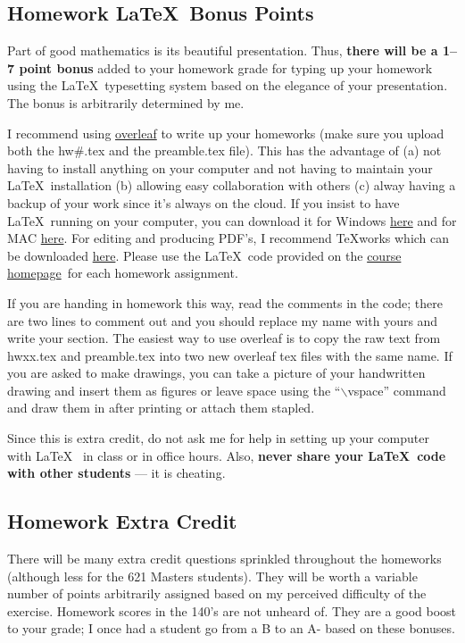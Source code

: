 \documentclass[12pt]{article}
\newcommand{\ingreen}[1]{\color{green}\textbf{#1} \color{black}}
\newcommand{\coursewebpage}{\href{https://github.com/kapelner/QC_Math_621_Fall_2020}{course homepage}}
\newcommand{\qu}[1]{``#1''}
\begin{document}
\subsection*{Homework \LaTeX~Bonus Points}

Part of good mathematics is its beautiful presentation. Thus, \ingreen{there will be a 1--7 point bonus} added to your homework grade  for typing up your homework using the \LaTeX ~typesetting system based on the elegance of your presentation. The bonus is arbitrarily determined by me.

I recommend using \href{http://overleaf.com}{overleaf} to write up your homeworks (make sure you upload both the hw\#.tex and the preamble.tex file). This has the advantage of (a) not having to install anything on your computer and not having to maintain your \LaTeX ~installation (b) allowing easy collaboration with others (c) alway having a backup of your work since it's always on the cloud. If you insist to have \LaTeX ~running on your computer, you can download it for Windows \href{http://www.miktex.org/download}{here} and for MAC \href{http://www.tug.org/mactex/}{here}. For editing and producing PDF's, I recommend \TeX works which can be downloaded \href{http://www.tug.org/texworks/#Getting_TeXworks}{here}. Please use the \LaTeX ~code provided on the \coursewebpage ~for each homework assignment. 

If you are handing in homework this way, read the comments in the code; there are two lines to comment out and you should replace my name with yours and write your section. The easiest way to use overleaf is to copy the raw text from hwxx.tex and preamble.tex into two new overleaf tex files with the same name. If you are asked to make drawings, you can take a picture of your handwritten drawing and insert them as figures or leave space using the \qu{$\backslash$vspace} command and draw them in after printing or attach them stapled.

Since this is extra credit, do not ask me for help in setting up your computer with \LaTeX~ in class or in office hours. Also, \textbf{never share your \LaTeX~code with other students} --- it is cheating.

\subsection*{Homework Extra Credit}

There will be many extra credit questions sprinkled throughout the homeworks (although less for the 621 Masters students). They will be worth a variable number of points arbitrarily assigned based on my perceived difficulty of the exercise. Homework scores in the 140's are not unheard of. They are a good boost to your grade; I once had a student go from a B to an A- based on these bonuses.
\end{document}
